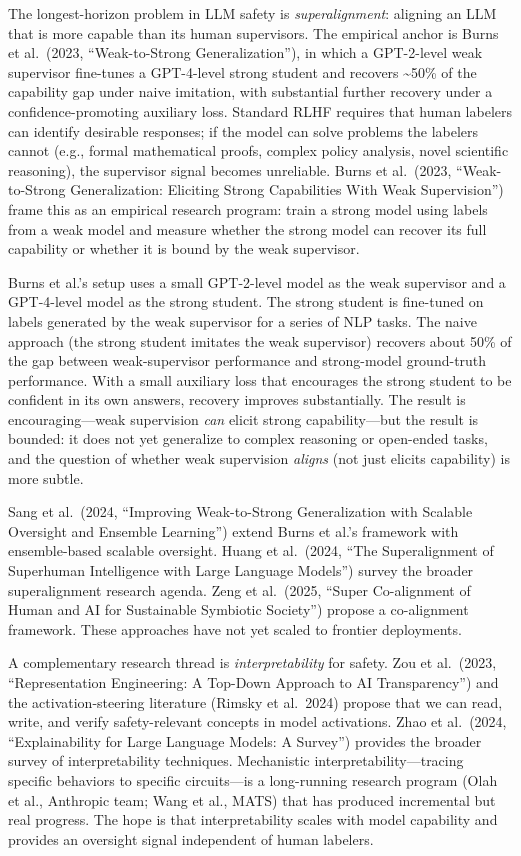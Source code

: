 \documentclass{article}
\begin{document}
The longest-horizon problem in LLM safety is \emph{superalignment}: aligning an LLM that is more capable than its human supervisors. The empirical anchor is Burns et al.~(2023, ``Weak-to-Strong Generalization''), in which a GPT-2-level weak supervisor fine-tunes a GPT-4-level strong student and recovers \textasciitilde50\% of the capability gap under naive imitation, with substantial further recovery under a confidence-promoting auxiliary loss. Standard RLHF requires that human labelers can identify desirable responses; if the model can solve problems the labelers cannot (e.g., formal mathematical proofs, complex policy analysis, novel scientific reasoning), the supervisor signal becomes unreliable. Burns et al.~(2023, ``Weak-to-Strong Generalization: Eliciting Strong Capabilities With Weak Supervision'') frame this as an empirical research program: train a strong model using labels from a weak model and measure whether the strong model can recover its full capability or whether it is bound by the weak supervisor.

Burns et al.'s setup uses a small GPT-2-level model as the weak supervisor and a GPT-4-level model as the strong student. The strong student is fine-tuned on labels generated by the weak supervisor for a series of NLP tasks. The naive approach (the strong student imitates the weak supervisor) recovers about 50\% of the gap between weak-supervisor performance and strong-model ground-truth performance. With a small auxiliary loss that encourages the strong student to be confident in its own answers, recovery improves substantially. The result is encouraging---weak supervision \emph{can} elicit strong capability---but the result is bounded: it does not yet generalize to complex reasoning or open-ended tasks, and the question of whether weak supervision \emph{aligns} (not just elicits capability) is more subtle.

Sang et al.~(2024, ``Improving Weak-to-Strong Generalization with Scalable Oversight and Ensemble Learning'') extend Burns et al.'s framework with ensemble-based scalable oversight. Huang et al.~(2024, ``The Superalignment of Superhuman Intelligence with Large Language Models'') survey the broader superalignment research agenda. Zeng et al.~(2025, ``Super Co-alignment of Human and AI for Sustainable Symbiotic Society'') propose a co-alignment framework. These approaches have not yet scaled to frontier deployments.

A complementary research thread is \emph{interpretability} for safety. Zou et al.~(2023, ``Representation Engineering: A Top-Down Approach to AI Transparency'') and the activation-steering literature (Rimsky et al.~2024) propose that we can read, write, and verify safety-relevant concepts in model activations. Zhao et al.~(2024, ``Explainability for Large Language Models: A Survey'') provides the broader survey of interpretability techniques. Mechanistic interpretability---tracing specific behaviors to specific circuits---is a long-running research program (Olah et al., Anthropic team; Wang et al., MATS) that has produced incremental but real progress. The hope is that interpretability scales with model capability and provides an oversight signal independent of human labelers.
\end{document}
